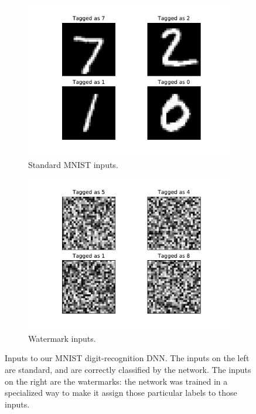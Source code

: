 \documentclass{easychair}
\begin{document}
\begin{figure}[htp]
  \centering
  \begin{subfigure}{0.4\linewidth}
    \includegraphics[width=\linewidth]{../data/mnist.pdf}
    \caption{Standard MNIST inputs.}
  \label{fig:mnistExample}
  \end{subfigure}
  \begin{subfigure}{0.4\linewidth}
    \includegraphics[width=\linewidth]{../data/wm.pdf}
     \caption{Watermark inputs.}
  \label{fig:noiseExample}
  \end{subfigure}
  \caption{Inputs to our MNIST digit-recognition DNN. The inputs on the
  left are standard, and are correctly classified by the network. The
  inputs on the right are the watermarks: the network was trained in a
  specialized way to make it assign those particular labels to those inputs.}
\label{fig:inputExample}
\end{figure}
\end{document}
